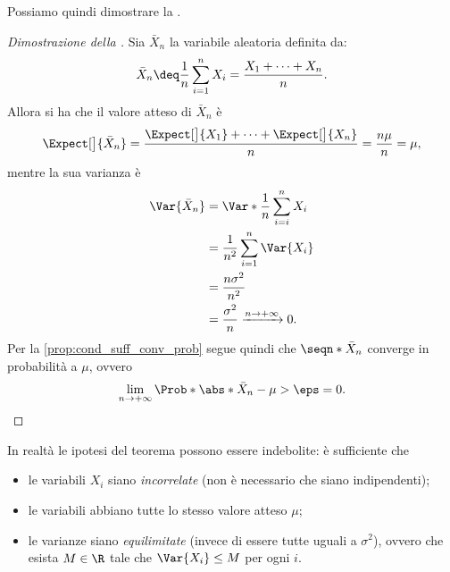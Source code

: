 Possiamo quindi dimostrare la .
\begin{proof}
    [Dimostrazione della ]
    Sia $\bar X_n$ la variabile aleatoria definita da: \[
        \bar X_n \deq \frac{1}{n}\sum_{i = 1}^{n}X_i = \frac{X_1 + \dots + X_n}{n}.
    \] Allora si ha che il valore atteso di $\bar X_n$ è \[
       \Expect[\big]{\bar X_n} = \frac{\Expect[\big]{X_1} + \dots + \Expect[\big]{X_n}}{n} = \frac{n\mu}{n} = \mu, 
    \] mentre la sua varianza è \begin{align*}
        \Var{\bar X_n} 
        &= \Var*{\frac1n \sum_{i = i}^n X_i} \\
        &= \frac{1}{n^2} \sum_{i = 1}^n \Var{X_i}\\
        &= \frac{n\sigma^2}{n^2}\\
        &= \frac{\sigma^2}{n} \xrightarrow{n \to +\infty} 0.
    \end{align*} Per la \autoref{prop:cond_suff_conv_prob} segue quindi che $\seqn*{\bar X_n}$ converge in probabilità a $\mu$, ovvero \[
        \lim_{n \to +\infty} \Prob*{\abs*{\bar X_n - \mu} > \eps} = 0. \qedhere
    \]
\end{proof}

In realtà le ipotesi del teorema possono essere indebolite: è sufficiente che 
\begin{itemize}
    \item le variabili $X_i$ siano \emph{incorrelate} (non è necessario che siano indipendenti);
    \item le variabili abbiano tutte lo stesso valore atteso $\mu$;
    \item le varianze siano \emph{equilimitate} (invece di essere tutte uguali a $\sigma^2$), ovvero che esista $M \in \R$ tale che $\Var{X_i} \leq M$ per ogni $i$.
\end{itemize}
